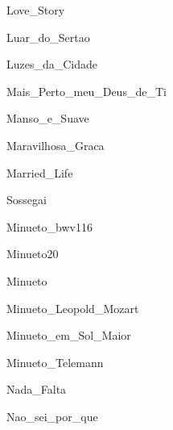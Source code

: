 \documentclass{article}
\begin{document}

{Love_Story}


{Luar_do_Sertao}


{Luzes_da_Cidade}


{Mais_Perto_meu_Deus_de_Ti}


{Manso_e_Suave}


{Maravilhosa_Graca}


{Married_Life}


{Sossegai}


{Minueto_bwv116}


{Minueto20}


{Minueto}


{Minueto_Leopold_Mozart}


{Minueto_em_Sol_Maior}


{Minueto_Telemann}


{Nada_Falta}


{Nao_sei_por_que}
\end{document}
